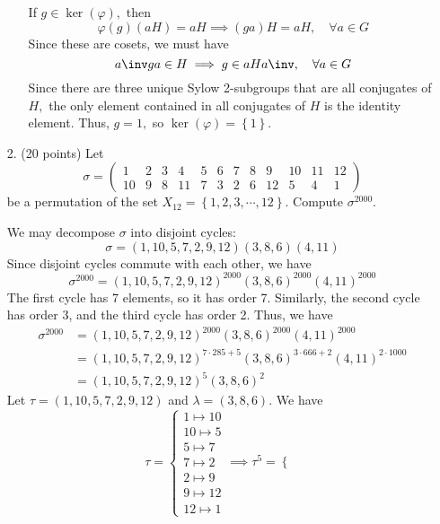 \documentclass{article}
\begin{document}
\begin{itemize}
\begin{enumerate}[(a)]
\begin{soln}
					If $g\in \ker(\varphi),$ then
					\[\varphi(g)(aH)=aH\implies (ga)H=aH, \quad \forall a\in G\]
					Since these are cosets, we must have
					\[a\inv ga\in H\implies g\in aHa\inv, \quad \forall a\in G\]
					Since there are three unique Sylow 2-subgroups that are all conjugates of $H,$ the only element contained in all conjugates of $H$ is the identity element. Thus, $g=1,$ so $\ker(\varphi)=\left\{ 1 \right\}.$
				\end{soln}
				
		\end{enumerate}

		\newpage

	\item[2.] (20 points) Let
		\[\sigma=\begin{pmatrix}
				1 & 2 & 3 & 4 & 5 & 6 & 7 & 8 & 9 & 10 & 11 & 12 \\
				10 & 9 & 8 & 11 & 7 & 3 & 2 & 6 & 12 & 5 & 4 & 1
		\end{pmatrix}\]
		be a permutation of the set $X_{12}=\left\{ 1, 2, 3, \cdots, 12 \right\}.$ Compute $\sigma^{2000}.$
		\begin{soln}
			We may decompose $\sigma$ into disjoint cycles:
			\[\sigma=(1, 10, 5, 7, 2, 9, 12)(3, 8, 6)(4, 11)\]
			Since disjoint cycles commute with each other, we have
			\[\sigma^{2000} = (1, 10, 5, 7, 2, 9, 12)^{2000}(3, 8, 6)^{2000}(4, 11)^{2000}\]
			The first cycle has 7 elements, so it has order 7. Similarly, the second cycle has order 3, and the third cycle has order 2. Thus, we have
			\begin{align*}
				\sigma^{2000} &= (1, 10, 5, 7, 2, 9, 12)^{2000}(3, 8, 6)^{2000}(4, 11)^{2000} \\
				&= (1, 10, 5, 7, 2, 9, 12)^{7\cdot 285 + 5}(3, 8, 6)^{3\cdot 666 + 2}(4, 11)^{2\cdot 1000} \\
				&= (1, 10, 5, 7, 2, 9, 12)^5 (3, 8, 6)^2
			\end{align*}
			Let $\tau=(1, 10, 5, 7, 2, 9, 12)$ and $\lambda=(3, 8, 6).$ We have
			\[\tau=\begin{cases}
					1\mapsto 10 \\
					10\mapsto 5 \\
					5\mapsto 7 \\
					7\mapsto 2 \\
					2\mapsto 9 \\
					9\mapsto 12 \\
					12\mapsto 1
				\end{cases} \implies \tau^5 = \begin{cases}

\end{cases}\]
\end{soln}
\end{itemize}
\end{document}
